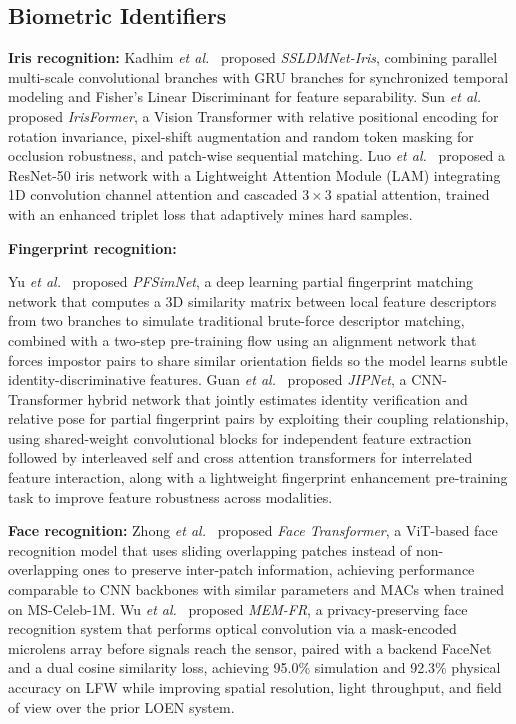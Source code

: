 \subsection{Biometric Identifiers}
\textbf{Iris recognition:}
Kadhim \textit{et al.}~\cite{kadhim2025deep} proposed \textit{SSLDMNet-Iris}, combining parallel multi-scale convolutional branches with GRU branches for synchronized temporal modeling and Fisher's Linear Discriminant for feature separability. Sun \textit{et al.}~\cite{sun2024irisformer} proposed \textit{IrisFormer}, a Vision Transformer with relative positional encoding for rotation invariance, pixel-shift augmentation and random token masking for occlusion robustness, and patch-wise sequential matching. Luo \textit{et al.}~\cite{luo2025novel} proposed a ResNet-50 iris network with a Lightweight Attention Module (LAM) integrating 1D convolution channel attention and cascaded $3\times 3$ spatial attention, trained with an enhanced triplet loss that adaptively mines hard samples.

\textbf{Fingerprint recognition:}

Yu \textit{et al.}~\cite{yu2024partial} proposed \textit{PFSimNet}, a deep learning partial fingerprint matching network that computes a 3D similarity matrix between local feature descriptors from two branches to simulate traditional brute-force descriptor matching, combined with a two-step pre-training flow using an alignment network that forces impostor pairs to share similar orientation fields so the model learns subtle identity-discriminative features. Guan \textit{et al.}~\cite{guan2024joint} proposed \textit{JIPNet}, a CNN-Transformer hybrid network that jointly estimates identity verification and relative pose for partial fingerprint pairs by exploiting their coupling relationship, using shared-weight convolutional blocks for independent feature extraction followed by interleaved self  and cross attention transformers for interrelated feature interaction, along with a lightweight fingerprint enhancement pre-training task to improve feature robustness across modalities.

\textbf{Face recognition:}
Zhong \textit{et al.}~\cite{zhong2021face} proposed \textit{Face Transformer}, a ViT-based face recognition model that uses sliding overlapping patches instead of non-overlapping ones to preserve inter-patch information, achieving performance comparable to CNN backbones with similar parameters and MACs when trained on MS-Celeb-1M. Wu \textit{et al.}~\cite{wu2025privacy} proposed \textit{MEM-FR}, a privacy-preserving face recognition system that performs optical convolution via a mask-encoded microlens array before signals reach the sensor, paired with a backend FaceNet and a dual cosine similarity loss, achieving 95.0\% simulation and 92.3\% physical accuracy on LFW while improving spatial resolution, light throughput, and field of view over the prior LOEN system.
